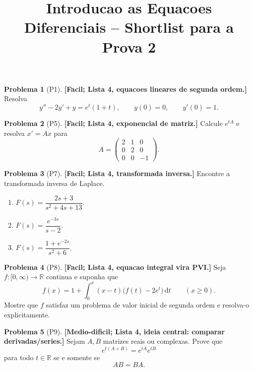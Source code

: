 \documentclass[10pt,a4paper]{amsart}
\title{Introducao as Equacoes Diferenciais -- Shortlist para a Prova 2}
\newcommand{\R}{\mathbb{R}}
\renewcommand{\d}{\mathrm{d}}
\theoremstyle{definition}
\newtheorem{problema}{Problema}
\begin{document}
\maketitle


\vspace{4mm}

\begin{problema}[P1]
\textbf{[Facil; Lista 4, equacoes lineares de segunda ordem.]}
Resolva
\[
    y''-2y'+y=e^t(1+t),
    \qquad y(0)=0,\qquad y'(0)=1.
\]
\end{problema}

\begin{problema}[P5]
\textbf{[Facil; Lista 4, exponencial de matriz.]}
Calcule $e^{tA}$ e resolva $x'=Ax$ para
\[
    A=\begin{pmatrix}
        2&1&0\\
        0&2&0\\
        0&0&-1
    \end{pmatrix}.
\]
\end{problema}

\begin{problema}[P7]
\textbf{[Facil; Lista 4, transformada inversa.]}
Encontre a transformada inversa de Laplace.
\begin{enumerate}[label=(\alph*)]
    \item $F(s)=\dfrac{2s+3}{s^2+4s+13}$.
    \item $F(s)=\dfrac{e^{-3s}}{s-2}$.
    \item $F(s)=\dfrac{1+e^{-2s}}{s^2+6}$.
\end{enumerate}
\end{problema}

\begin{problema}[P8]
\textbf{[Facil; Lista 4, equacao integral vira PVI.]}
Seja $f:[0,\infty)\to\R$ continua e suponha que
\[
    f(x)=1+\int_0^x (x-t)\bigl(f(t)-2e^t\bigr)\,\d t
    \qquad(x\ge 0).
\]
Mostre que $f$ satisfaz um problema de valor inicial de segunda ordem e
resolva-o explicitamente.
\end{problema}

\begin{problema}[P9]
\textbf{[Medio-dificil; Lista 4, ideia central: comparar derivadas/series.]}
Sejam $A,B$ matrizes reais ou complexas. Prove que
\[
    e^{t(A+B)}=e^{tA}e^{tB}
\]
para todo $t\in\R$ se e somente se
\[
    AB=BA.
\]
\end{problema}
\end{document}
